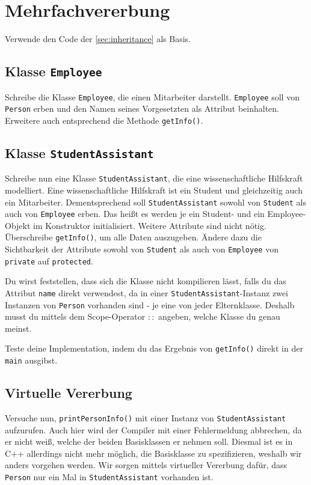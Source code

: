 \section{\ExercisePrefixObjectOrientation Mehrfachvererbung}
Verwende den Code der \ref{sec:inheritance} als Basis.

\subsection{Klasse \lstinline{Employee}}
Schreibe die Klasse \lstinline{Employee}, die einen Mitarbeiter darstellt.
\lstinline{Employee} soll von \lstinline{Person} erben und den Namen seines Vorgesetzten als Attribut beinhalten.
Erweitere auch entsprechend die Methode \lstinline{getInfo()}.

\subsection{Klasse \lstinline{StudentAssistant}}
Schreibe nun eine Klasse \lstinline{StudentAssistant}, die eine wissenschaftliche Hilfskraft modelliert.
Eine wissenschaftliche Hilfskraft ist ein Student und gleichzeitig auch ein Mitarbeiter.
Dementsprechend soll \lstinline{StudentAssistant} sowohl von \lstinline{Student} als auch von \lstinline{Employee} erben. 
Das heißt es werden je ein Student- und ein Employee-Objekt im Konstruktor initialisiert.
Weitere Attribute sind nicht nötig.
Überschreibe \lstinline{getInfo()}, um alle Daten auszugeben.
Ändere dazu die Sichtbarkeit der Attribute sowohl von \lstinline{Student} als auch von \lstinline{Employee} von \lstinline{private} auf \lstinline{protected}.

Du wirst feststellen, dass sich die Klasse nicht kompilieren lässt, falls du das Attribut \lstinline{name} direkt verwendest, da in einer \lstinline{StudentAssistant}-Instanz zwei Instanzen von \lstinline{Person} vorhanden sind - je eine von jeder Elternklasse. Deshalb musst du mittels dem Scope-Operator $::$ angeben, welche Klasse du genau meinst.


Teste deine Implementation, indem du das Ergebnis von \lstinline{getInfo()} direkt in der \lstinline{main} ausgibst.

\subsection{Virtuelle Vererbung}
Versuche nun, \lstinline{printPersonInfo()} mit einer Instanz von \lstinline{StudentAssistant} aufzurufen. Auch hier wird der Compiler mit einer Fehlermeldung abbrechen, da er nicht weiß, welche der beiden Basisklassen er nehmen soll.
Diesmal ist es in C++ allerdings nicht mehr möglich, die Basisklasse zu spezifizieren, weshalb wir anders vorgehen werden.
Wir sorgen mittels virtueller Vererbung dafür, dass \lstinline{Person} nur ein Mal in \lstinline{StudentAssistant} vorhanden ist.

